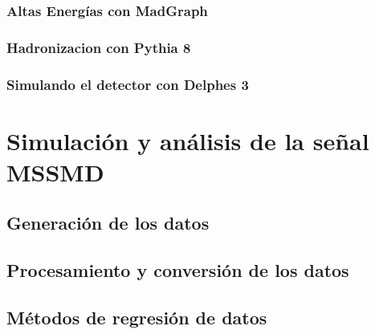 \documentclass[12pt]{report}
\begin{document}
		\subsection{Altas Energías con MadGraph}\label{C_madgraph}
		

		\subsection{Hadronizacion con Pythia 8}\label{C_pythia8}
		

		\subsection{Simulando el detector con Delphes 3}\label{C_delphes}
		


\chapter{Simulación y análisis de la señal MSSMD}


    
    \section{Generación de los datos}\label{Cap_genera}
    
        
    \section{Procesamiento y conversión de los datos}
    
        
    \section{Métodos de regresión de datos}
    \label{Cap_regresion}
    
\end{document}
